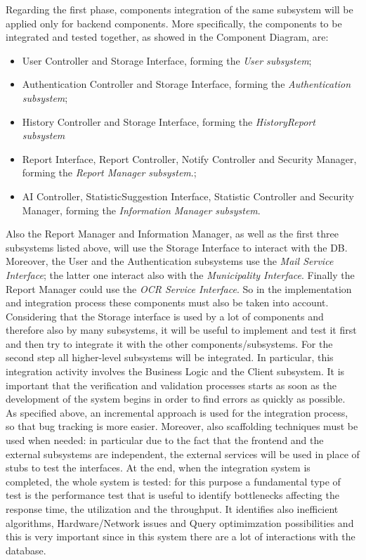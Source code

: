 \documentclass{report}
\begin{document}
\noindent Regarding the first phase, components integration of the same subsystem will be applied only for backend components. More specifically, the components to be integrated and tested together, as showed in the Component Diagram, are:
\begin{itemize}
\item User Controller and Storage Interface, forming the \textit{User subsystem};
\item Authentication Controller and Storage Interface, forming the \textit{Authentication subsystem};
\item History Controller and Storage Interface, forming the \textit{HistoryReport subsystem}
\item Report Interface, Report Controller, Notify Controller and Security Manager, forming the \textit{Report Manager subsystem}.;
\item AI Controller, StatisticSuggestion Interface, Statistic Controller and Security Manager, forming the \textit{Information Manager subsystem}.
\end{itemize}
Also the Report Manager and Information Manager, as well as the first three subsystems listed above, will use the Storage Interface to interact with the DB. Moreover, the User and the Authentication subsystems use the \textit{Mail Service Interface}; the latter one interact also with the \textit{Municipality Interface}. Finally the Report Manager could use the \textit{OCR Service Interface}. So in the implementation and integration process these components must also be taken into account. 
Considering that the Storage interface is used by a lot of components and therefore also by many subsystems, it will be useful to implement and test it first and then try to integrate it with the other components/subsystems. 
\newline
\newline
For the second step all higher-level subsystems will be integrated. In particular, this integration activity involves the Business Logic and the Client subsystem.
\newline
It is important that the verification and validation processes starts as soon as the development of the system begins in order to find errors as quickly as possible. As specified above, an incremental approach is used for the integration process, so that bug tracking is more easier. Moreover, also scaffolding techniques must be used when needed: in particular due to the fact that the frontend and the external subsystems are independent, the external services will be used in place of stubs to test the interfaces.
\newline
At the end, when the integration system is completed, the whole system is tested: for this purpose a fundamental type of test is the performance test that is useful to identify bottlenecks affecting the response time, the utilization and the throughput. It identifies also inefficient algorithms, Hardware/Network issues and Query optimimzation possibilities and this is very important since in this system there are a lot of interactions with the database. 
\newpage
\end{document}

